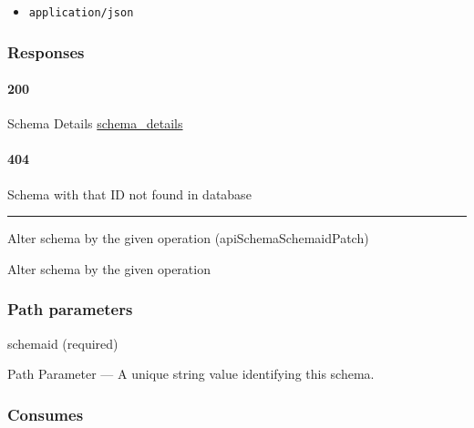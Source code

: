 \begin{itemize}
\tightlist
\item
  \texttt{application/json}
\end{itemize}

\hypertarget{responses-78}{%
\subsubsection{Responses}\label{responses-78}}

\hypertarget{section-256}{%
\paragraph{200}\label{section-256}}

Schema Details \protect\hyperlink{schema_details}{schema\_details}

\hypertarget{section-257}{%
\paragraph{404}\label{section-257}}

Schema with that ID not found in database \protect\hyperlink{}{}

\begin{center}\rule{0.5\linewidth}{\linethickness}\end{center}

\protect\hypertarget{apiSchemaSchemaidPatch}{}{}

\begin{Shaded}
\begin{Highlighting}[]
\end{Highlighting}
\end{Shaded}

Alter schema by the given operation ({apiSchemaSchemaidPatch})

Alter schema by the given operation

\hypertarget{path-parameters-38}{%
\subsubsection{Path parameters}\label{path-parameters-38}}

schemaid (required)

{Path Parameter} --- A unique string value identifying this schema.

\hypertarget{consumes-26}{%
\subsubsection{Consumes}\label{consumes-26}}

